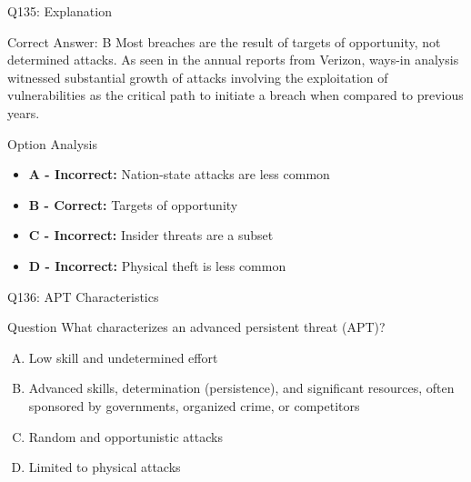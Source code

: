 \documentclass{beamer}
\begin{document}
	\begin{frame}{Q135: Explanation}
		\begin{block}{Correct Answer: B}
			Most breaches are the result of targets of opportunity, not determined attacks. As seen in the annual reports from Verizon, ways-in analysis witnessed substantial growth of attacks involving the exploitation of vulnerabilities as the critical path to initiate a breach when compared to previous years.
		\end{block}
		\begin{block}{Option Analysis}
			\begin{itemize}
				\item \textbf{A - Incorrect:} Nation-state attacks are less common
				\item \textbf{B - Correct:} Targets of opportunity
				\item \textbf{C - Incorrect:} Insider threats are a subset
				\item \textbf{D - Incorrect:} Physical theft is less common
			\end{itemize}
		\end{block}
	\end{frame}
	
	\begin{frame}{Q136: APT Characteristics}
		\begin{block}{Question}
			What characterizes an advanced persistent threat (APT)?
		\end{block}
		\begin{enumerate}[(A)]
			\item Low skill and undetermined effort
			\item Advanced skills, determination (persistence), and significant resources, often sponsored by governments, organized crime, or competitors
			\item Random and opportunistic attacks
			\item Limited to physical attacks
		\end{enumerate}
	\end{frame}
	
\end{document}
